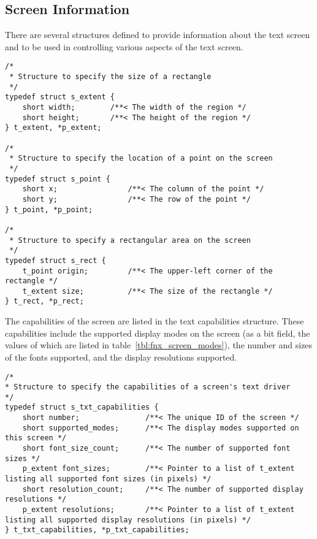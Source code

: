 \subsection*{Screen Information}
There are several structures defined to provide information about the text screen and to be used in controlling various aspects
of the text screen.

\begin{lstlisting}
/*
 * Structure to specify the size of a rectangle
 */
typedef struct s_extent {
    short width;        /**< The width of the region */
    short height;       /**< The height of the region */
} t_extent, *p_extent;

/*
 * Structure to specify the location of a point on the screen
 */
typedef struct s_point {
    short x;                /**< The column of the point */
    short y;                /**< The row of the point */
} t_point, *p_point;

/*
 * Structure to specify a rectangular area on the screen
 */
typedef struct s_rect {
    t_point origin;         /**< The upper-left corner of the rectangle */
    t_extent size;          /**< The size of the rectangle */
} t_rect, *p_rect;
\end{lstlisting}

The capabilities of the screen are listed in the text capabilities structure.
These capabilities include the supported display modes on the screen (as a bit field, the values of which are listed in table~\ref{tbl:fnx_screen_modes}),
the number and sizes of the fonts supported, and the display resolutions supported.

\begin{lstlisting}
/*
* Structure to specify the capabilities of a screen's text driver
*/
typedef struct s_txt_capabilities {
    short number;               /**< The unique ID of the screen */
    short supported_modes;      /**< The display modes supported on this screen */
    short font_size_count;      /**< The number of supported font sizes */
    p_extent font_sizes;        /**< Pointer to a list of t_extent listing all supported font sizes (in pixels) */
    short resolution_count;     /**< The number of supported display resolutions */
    p_extent resolutions;       /**< Pointer to a list of t_extent listing all supported display resolutions (in pixels) */
} t_txt_capabilities, *p_txt_capabilities;
\end{lstlisting}

